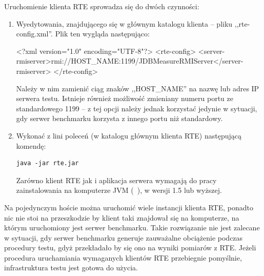 Uruchomienie klienta RTE sprowadza się do dwóch czynności:
\begin{enumerate}
\item Wyedytowania, znajdującego się w głównym katalogu klienta -- pliku ,,rte-config.xml''.
Plik ten wygląda następująco:
\begin{codeblock}
<?xml version="1.0" encoding="UTF-8"?>
<rte-config>
	<server-rmiserver>rmi://HOST_NAME:1199/JDBMeasureRMIServer</server-rmiserver>
</rte-config>
\end{codeblock}
Należy w nim zamienić ciąg znaków ,,HOST\_NAME'' na nazwę lub adres IP serwera testu.
Istnieje również możliwość zmieniany numeru portu ze standardowego 1199 --  z tej opcji należy jednak korzystać
jedynie w sytuacji, gdy serwer benchmarku korzysta z innego portu niż standardowy.
\item Wykonać z lini poleceń (w katalogu głównym klienta RTE) następującą komendę: 
\begin{Verbatim}
java -jar rte.jar
\end{Verbatim}
Zarówno klient RTE jak i aplikacja serwera wymagają do pracy zainstalowania na
komputerze JVM (~\cite{JVM1}),
w wersji 1.5 lub wyższej.
\end{enumerate}
Na pojedynczym hoście można uruchomić wiele instancji klienta RTE, ponadto nic nie stoi na przeszkodzie
by klient taki znajdował się na komputerze, na którym uruchomiony jest serwer benchmarku.
Takie rozwiązanie nie jest zalecane w sytuacji, gdy serwer benchmarku generuje zauważalne obciążenie
podczas procedury testu, gdyż przekładało by się ono na wyniki pomiarów z RTE. Jeżeli procedura 
uruchamiania wymaganych klientów RTE przebiegnie pomyślnie, infrastruktura testu jest gotowa do użycia.

